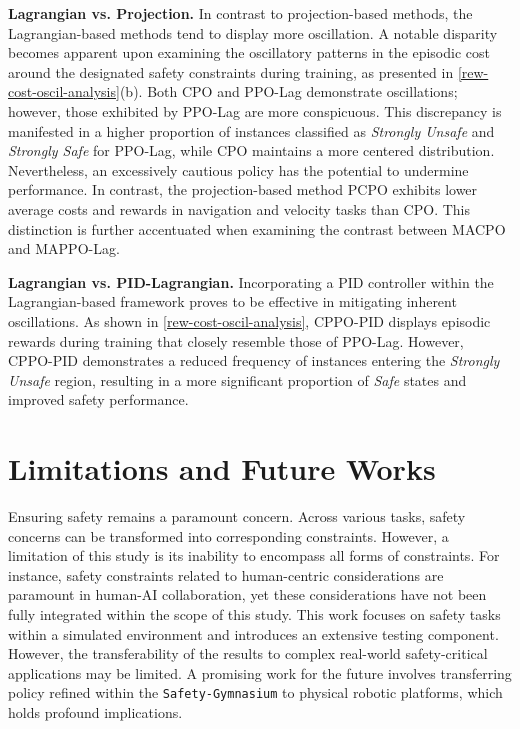 \documentclass{article}
\begin{document}
\textbf{Lagrangian vs. Projection.} In contrast to projection-based methods, the Lagrangian-based methods tend to display more oscillation. A notable disparity becomes apparent upon examining the oscillatory patterns in the episodic cost around the designated safety constraints during training, as presented in \autoref{rew-cost-oscil-analysis}(b). Both CPO \cite{achiam2017constrained} and PPO-Lag \cite{ray2019benchmarking} demonstrate oscillations; however, those exhibited by PPO-Lag are more conspicuous. This discrepancy is manifested in a higher proportion of instances classified as \textit{Strongly Unsafe} and \textit{Strongly Safe} for PPO-Lag, while CPO maintains a more centered distribution. Nevertheless, an excessively cautious policy has the potential to undermine performance. In contrast, the projection-based method PCPO \cite{yang2020projection} exhibits lower average costs and rewards in navigation and velocity tasks than CPO. This distinction is further accentuated when examining the contrast between MACPO and MAPPO-Lag.

\textbf{Lagrangian vs. PID-Lagrangian.}
Incorporating a PID controller within the Lagrangian-based framework proves to be effective in mitigating inherent oscillations. As shown in \autoref{rew-cost-oscil-analysis}, CPPO-PID \cite{stooke2020responsive} displays episodic rewards during training that closely resemble those of PPO-Lag. However, CPPO-PID demonstrates a reduced frequency of instances entering the \textit{Strongly Unsafe} region, resulting in a more significant proportion of \textit{Safe} states and improved safety performance.


\section{Limitations and Future Works}

Ensuring safety remains a paramount concern. Across various tasks, safety concerns can be transformed into corresponding constraints. However, a limitation of this study is its inability to encompass all forms of constraints. For instance, safety constraints related to human-centric considerations are paramount in human-AI collaboration, yet these considerations have not been fully integrated within the scope of this study. This work focuses on safety tasks within a simulated environment and introduces an extensive testing component. However, the transferability of the results to complex real-world safety-critical applications may be limited. A promising work for the future involves transferring policy refined within the \texttt{Safety-Gymnasium} to physical robotic platforms, which holds profound implications.
\end{document}
